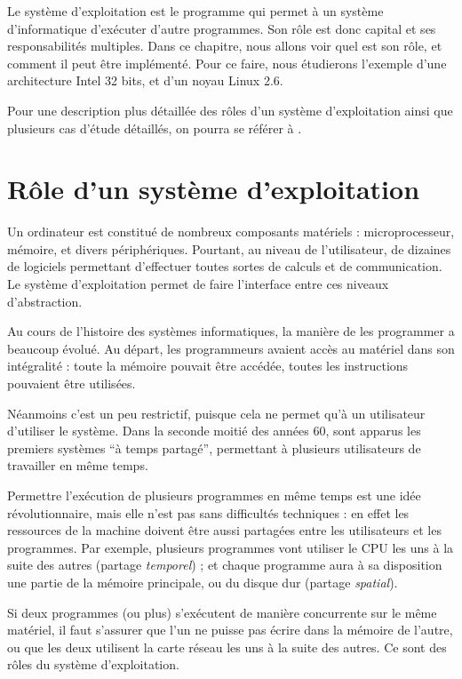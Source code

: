 Le système d'exploitation est le programme qui permet à un système
d'informatique d'exécuter d'autre programmes. Son rôle est donc capital et ses
responsabilités multiples. Dans ce chapitre, nous allons voir quel est son rôle,
et comment il peut être implémenté. Pour ce faire, nous étudierons l'exemple
d'une architecture Intel 32 bits, et d'un noyau Linux 2.6.

Pour une description plus détaillée des rôles d'un système d'exploitation ainsi
que plusieurs cas d'étude détaillés, on pourra se référer à \cite{tanenbaum}.

\section{Rôle d'un système d'exploitation}

Un ordinateur est constitué de nombreux composants matériels : microprocesseur,
mémoire, et divers périphériques. Pourtant, au niveau de l'utilisateur, de
dizaines de logiciels permettant d'effectuer toutes sortes de calculs et de
communication. Le système d'exploitation permet de faire l'interface entre ces
niveaux d'abstraction.

Au cours de l'histoire des systèmes informatiques, la manière de les programmer
a beaucoup évolué. Au départ, les programmeurs avaient accès au matériel dans
son intégralité : toute la mémoire pouvait être accédée, toutes les instructions
pouvaient être utilisées.

Néanmoins c'est un peu restrictif, puisque cela ne permet qu'à un utilisateur
d'utiliser le système. Dans la seconde moitié des années 60, sont apparus les
premiers systèmes ``à temps partagé'', permettant à plusieurs utilisateurs de
travailler en même temps.

Permettre l'exécution de plusieurs programmes en même temps est une idée
révolutionnaire, mais elle n'est pas sans difficultés techniques : en effet les
ressources de la machine doivent être aussi partagées entre les utilisateurs et
les programmes. Par exemple, plusieurs programmes vont utiliser le CPU les uns à
la suite des autres (partage \emph{temporel}) ; et chaque programme aura à sa
disposition une partie de la mémoire principale, ou du disque dur (partage
\emph{spatial}).

Si deux programmes (ou plus) s'exécutent de manière concurrente sur le même
matériel, il faut s'assurer que l'un ne puisse pas écrire dans la mémoire de
l'autre, ou que les deux utilisent la carte réseau les uns à la suite des
autres. Ce sont des rôles du système d'exploitation.

